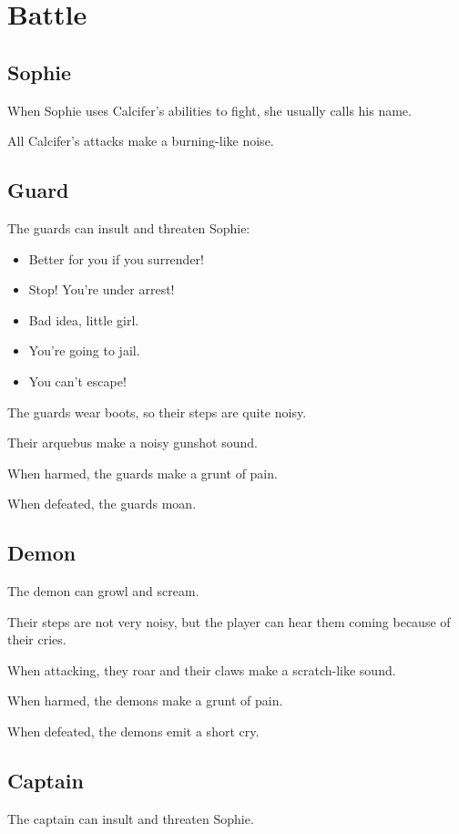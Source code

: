 \section{Battle}

\subsection{Sophie}
When Sophie uses Calcifer's abilities to fight, she usually calls his name.

All Calcifer's attacks make a burning-like noise.

\subsection{Guard}
The guards can insult and threaten Sophie:
\begin{itemize}
	\item Better for you if you surrender!
	\item Stop! You're under arrest!
	\item Bad idea, little girl.
	\item You're going to jail.
	\item You can't escape!
\end{itemize}

The guards wear boots, so their steps are quite noisy.

Their arquebus make a noisy gunshot sound.

When harmed, the guards make a grunt of pain.

When defeated, the guards moan.

\subsection{Demon}
The demon can growl and scream.

Their steps are not very noisy, but the player can hear them coming because of their cries.

When attacking, they roar and their claws make a scratch-like sound.

When harmed, the demons make a grunt of pain.

When defeated, the demons emit a short cry.

\subsection{Captain}
The captain can insult and threaten Sophie.

